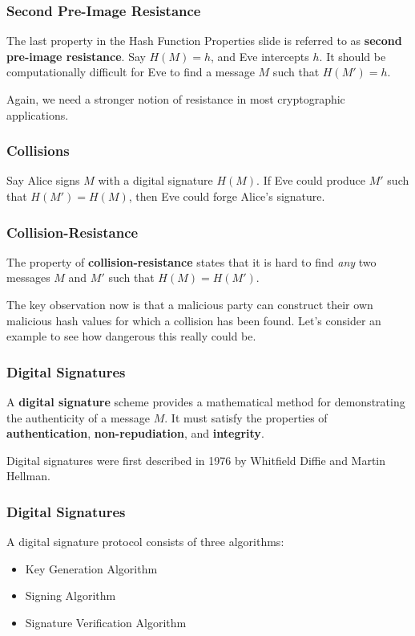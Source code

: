 \documentclass{beamer}
\newcommand{\<}{\langle}
\renewcommand{\>}{\rangle}
\begin{document}
\begin{frame}
\frametitle{Second Pre-Image Resistance}

The last property in the Hash Function Properties slide is referred to as \textbf{second pre-image resistance}. Say $H(M) = h$, and Eve intercepts $h$. It should be computationally difficult for Eve to find a message $M$ such that $H(M') = h$.
\newline

Again, we need a stronger notion of resistance in most cryptographic applications. 
\end{frame}


\begin{frame}
\frametitle{Collisions}

Say Alice signs $M$ with a digital signature $H(M)$. If Eve could produce $M'$ such that $H(M')=H(M)$, then Eve could forge Alice's signature.
\end{frame}


\begin{frame}
\frametitle{Collision-Resistance}

The property of \textbf{collision-resistance} states that it is hard to find \emph{any} two messages $M$ and $M'$ such that $H(M) = H(M')$. \newline

The key observation now is that a malicious party can construct their own malicious hash values for which a collision has been found. Let's consider an example to see how dangerous this really could be. 
\end{frame}


\begin{frame}
\frametitle{Digital Signatures}

A \textbf{digital signature} scheme provides a mathematical method for demonstrating the authenticity of a message $M$.  It must satisfy the properties of \textbf{authentication}, \textbf{non-repudiation}, and \textbf{integrity}.\newline

Digital signatures were first described in 1976 by Whitfield Diffie and Martin Hellman.
\end{frame}

\begin{frame}
\frametitle{Digital Signatures}

A digital signature protocol consists of three algorithms:
\begin{itemize}
\item Key Generation Algorithm
\item Signing Algorithm
\item Signature Verification Algorithm
\end{itemize}
\end{frame}
\end{document}
